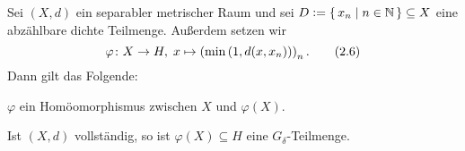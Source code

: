 \documentclass[../main/main.tex]{subfiles}
\begin{document}
	\begin{Hilfssatz}
		\label{lem:characterizationpolishspaces}
		Sei $(X, d)$ ein separabler metrischer Raum und sei 
		$D \vcentcolon = \left\{\, x_n \; \middle| \; n \in \mathbb{N} \,\right\} \subseteq X$ eine abzählbare 
		dichte Teilmenge. Außerdem setzen wir
		\[\varphi \colon X \to H, \; x \mapsto \left(\min \left(1, d(x, x_n) \right) \right)_n  \text{.} \label{eq:2.6} \tag{2.6}\]
		Dann gilt das Folgende:
		\begin{enumeratethm}
			\item $\varphi$ ein Homöomorphismus zwischen $X$ und $\varphi(X)$.
			\item Ist $(X, d)$ vollständig, so ist $\varphi(X) \subseteq H$ 
			eine $G_\delta$-Teilmenge.
		\end{enumeratethm}
	\end{Hilfssatz}
	
\end{document}
